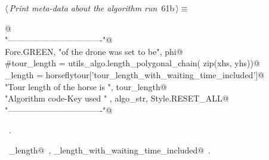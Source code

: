 \documentclass[11.5pt]{report}
\begin{document}
\vspace{-0.8cm} \newchunk
\begin{flushleft} \small
\begin{minipage}{\linewidth}\label{scrap88}\raggedright\small
{} $\langle\,${\itshape Print meta-data about the algorithm run}\nobreak\ {\footnotesize {61b}}$\,\rangle\equiv$
\vspace{-1ex}
\begin{list}{}{} \item
\mbox{}\verb@   @\\
\mbox{}\verb@print "----------------------------------"@\\
\mbox{}\verb@print Fore.GREEN, "\nSpeed of the drone was set to be", phi@\\
\mbox{}\verb@#tour_length = utils_algo.length_polygonal_chain( zip(xhs, yhs))@\\
\mbox{}\verb@tour_length = horseflytour['tour_length_with_waiting_time_included']@\\
\mbox{}\verb@print "Tour length of the horse is ",  tour_length@\\
\mbox{}\verb@print "Algorithm code-Key used "    , algo_str, Style.RESET_ALL@\\
\mbox{}\verb@print "----------------------------------\n"@\\
\mbox{}\verb@@{\NWsep}
\end{list}
\vspace{-1.5ex}
\footnotesize
\begin{list}{}{\setlength{\itemsep}{-\parsep}\setlength{\itemindent}{-\leftmargin}}
\item \NWtxtMacroRefIn\ .
\item \NWtxtIdentsUsed\nobreak\  \verb@tour_length@\nobreak\ , \verb@tour_length_with_waiting_time_included@\nobreak\ .
\item{}
\end{list}
\end{minipage}\vspace{4ex}
\end{flushleft}
\end{document}
